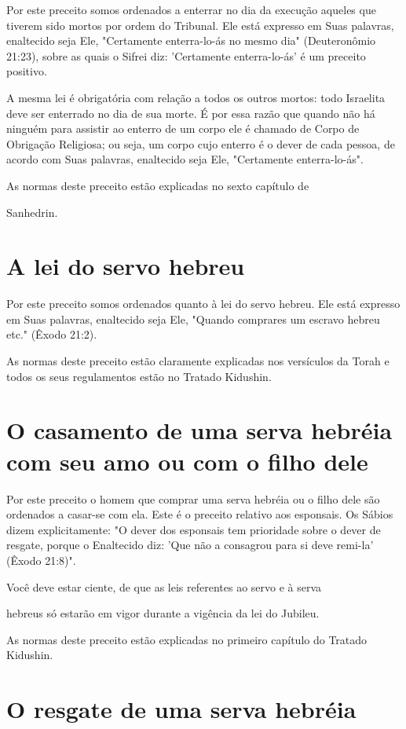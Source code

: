 \begin{itemize}
\begin{enumrate}
\begin{itemize}
\begin{itemize}
\begin{itemize}
Por este preceito somos ordenados a enterrar no dia da execução aqueles
que tiverem sido mortos por ordem do Tribunal. Ele está expresso em Suas
palavras, enaltecido seja Ele, "Certamente enterra-lo-ás no mesmo dia"
(Deuteronômio 21:23), sobre as quais o Sifrei diz: 'Certamente
enterra-lo-ás' é um preceito positivo.

A mesma lei é obrigatória com relação a todos os outros mortos: to­do
Israelita deve ser enterrado no dia de sua morte. É por essa razão que
quan­do não há ninguém para assistir ao enterro de um corpo ele é
chamado de Corpo de Obrigação Religiosa; ou seja, um corpo cujo enterro
é o dever de cada pessoa, de acordo com Suas palavras, enaltecido seja
Ele, "Certamente enterra-lo-ás".


As normas deste preceito estão explicadas no sexto capítulo de


Sanhedrin.

\section{A lei do servo hebreu}

Por este preceito somos ordenados quanto à lei do servo hebreu. Ele está
expresso em Suas palavras, enaltecido seja Ele, "Quando comprares um
escravo hebreu etc." (Êxodo 21:2).

As normas deste preceito estão claramente explicadas nos versícu­los da
Torah e todos os seus regulamentos estão no Tratado Kidushin.

\section{O casamento de uma serva hebréia com seu amo ou com o filho dele}

Por este preceito o homem que comprar uma serva hebréia ou o fi­lho dele
são ordenados a casar-se com ela. Este é o preceito relativo aos
espon­sais. Os Sábios dizem explicitamente: "O dever dos esponsais tem
prioridade sobre o dever de resgate, porque o Enaltecido diz: 'Que não a
consagrou para si deve remi-la' (Êxodo 21:8)".


Você deve estar ciente, de que as leis referentes ao servo e à serva

hebreus só estarão em vigor durante a vigência da lei do Jubileu.

As normas deste preceito estão explicadas no primeiro capítulo do
Tratado Kidushin.

\section{O resgate de uma serva hebréia}


\end{itemize}
\end{itemize}
\end{itemize}
\end{enumrate}
\end{itemize}
